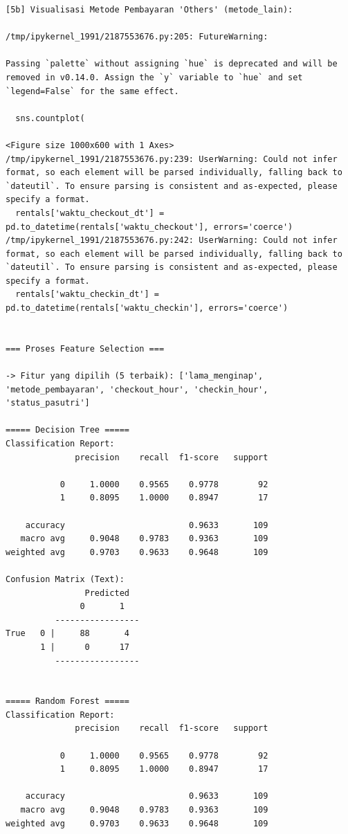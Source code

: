 \begin{lstlisting}[caption={Output 17}]
[5b] Visualisasi Metode Pembayaran 'Others' (metode_lain):

/tmp/ipykernel_1991/2187553676.py:205: FutureWarning: 

Passing `palette` without assigning `hue` is deprecated and will be removed in v0.14.0. Assign the `y` variable to `hue` and set `legend=False` for the same effect.

  sns.countplot(

<Figure size 1000x600 with 1 Axes>
/tmp/ipykernel_1991/2187553676.py:239: UserWarning: Could not infer format, so each element will be parsed individually, falling back to `dateutil`. To ensure parsing is consistent and as-expected, please specify a format.
  rentals['waktu_checkout_dt'] = pd.to_datetime(rentals['waktu_checkout'], errors='coerce')
/tmp/ipykernel_1991/2187553676.py:242: UserWarning: Could not infer format, so each element will be parsed individually, falling back to `dateutil`. To ensure parsing is consistent and as-expected, please specify a format.
  rentals['waktu_checkin_dt'] = pd.to_datetime(rentals['waktu_checkin'], errors='coerce')


=== Proses Feature Selection ===

-> Fitur yang dipilih (5 terbaik): ['lama_menginap', 'metode_pembayaran', 'checkout_hour', 'checkin_hour', 'status_pasutri']

===== Decision Tree =====
Classification Report:
              precision    recall  f1-score   support

           0     1.0000    0.9565    0.9778        92
           1     0.8095    1.0000    0.8947        17

    accuracy                         0.9633       109
   macro avg     0.9048    0.9783    0.9363       109
weighted avg     0.9703    0.9633    0.9648       109

Confusion Matrix (Text):
                Predicted
               0       1
          -----------------
True   0 |     88       4
       1 |      0      17
          -----------------


===== Random Forest =====
Classification Report:
              precision    recall  f1-score   support

           0     1.0000    0.9565    0.9778        92
           1     0.8095    1.0000    0.8947        17

    accuracy                         0.9633       109
   macro avg     0.9048    0.9783    0.9363       109
weighted avg     0.9703    0.9633    0.9648       109


\end{lstlisting}
